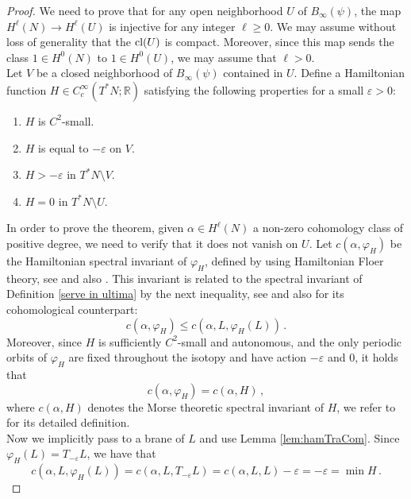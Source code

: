 \documentclass{article}
\newcommand{\1}{\mathbbm{1}}
\newcommand{\numberset}{\mathbb}
\newcommand{\R}{\numberset{R}}
\theoremstyle{remark}
\begin{document}
\begin{proof}
We need to prove that for any open neighborhood $U$ of $B_{\infty}(\psi)$, the map $H^{\ell}(N) \to H^{\ell}(U)$ is injective for any integer $\ell \ge 0$. We may assume without loss of generality that the $\textnormal{cl}(U)$ is compact. Moreover, since this map sends the class $1 \in H
^0(N)$ to $1 \in H^0(U)$, we may assume that $\ell > 0$. \\
Let $V$ be a closed neighborhood of $B_{\infty}(\psi)$ contained in $U$. Define a Hamiltonian function $H \in C^\infty_c(T^*N; \R)$ satisfying the following properties for a small $\varepsilon>0$:
\begin{enumerate}
\item $H$ is $C^2$-small.
\item $H$ is equal to $-\varepsilon$ on $V$.
\item $H > -\varepsilon$ in $T^*N\setminus V$.
\item $H = 0$ in $T^*N\setminus U$.
\end{enumerate}
In order to prove the theorem, given $\alpha \in H^{\ell}(N)$ a non-zero cohomology class of positive degree, we need to verify that it does not vanish on $U$. Let $c(\alpha, \varphi_H)$ be the Hamiltonian spectral invariant of $\varphi_H$, defined by using Hamiltonian Floer theory, see \cite{FS07} and also \cite{Lan16}. This invariant is related to the spectral invariant of Definition \ref{serve in ultima} by the next inequality, see \cite[Proposition 2.14]{monVicZap12} and also \cite[Lemma 6.1]{arnHumVit24} for its cohomological counterpart:
    \begin{equation}\label{open closed}
        c(\alpha, \varphi_H)\leq c(\alpha, L, \varphi_H(L))\, .
    \end{equation}
Moreover, since $H$ is sufficiently $C^2$-small and autonomous, and the only periodic orbits of $\varphi_H$ are fixed throughout the isotopy and have action $-\varepsilon$ and $0$, it holds that 
\begin{equation} \label{morse spectral}
c(\alpha, \varphi_H) = c(\alpha,H)\, ,
\end{equation}
where $c(\alpha,H)$ denotes the Morse theoretic spectral invariant of $H$, we refer to \cite[Page 29]{arnHumVit24} for its detailed definition. \\
Now we implicitly pass to a brane of $L$ and use Lemma \ref{lem:hamTraCom}. Since $\varphi_H(L)=T_{-\varepsilon}L$, we have that
\begin{equation}\label{eqn:minH}
c(\alpha, L,\varphi_H(L))=c(\alpha, L, T_{-\varepsilon}L)=c(\alpha, L, L)-\varepsilon=-\varepsilon=\min H\, .

\end{equation}
\end{proof}
\end{document}
